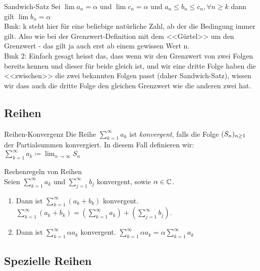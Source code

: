 \begin{theorem}{Sandwich-Satz}
    Sei $\lim a_n = \alpha$ und $\lim c_n = \alpha$ und $a_n \leq b_n \leq c_n, \forall n \geq k$ dann gilt $\lim b_n = \alpha$\\
    Bmk: k steht hier für eine beliebige natürliche Zahl, ab der die Bedingung immer gilt. Also wie bei der Grenzwert-Definition mit dem <<Gürtel>> um den Grenzwert - das gilt ja auch erst ab einem gewissen Wert n.\\
    Bmk 2: Einfach gesagt heisst das, dass wenn wir den Grenzwert von zwei Folgen bereits kennen und dieser für beide gleich ist, und wir eine dritte Folge haben die <<zwischen>> die zwei bekannten Folgen passt (daher Sandwich-Satz), wissen wir dass auch die dritte Folge den gleichen Grenzwert wie die anderen zwei hat.
\end{theorem}

\subsection{Reihen}

\begin{definition}{Reihen-Konvergenz}
    Die Reihe $\sum_{k = 1}^\infty a_k$ ist \emph{konvergent}, falls die Folge $\sequence[S]$ der Partialsummen konvergiert. In diesem Fall definieren wir: $\sum_{k = 1}^\infty a_k \coloneqq \lim_{n \to \infty} S_n$
\end{definition}

\begin{theorem}{Rechenregeln von Reihen}
    \\Seien $\sum_{k=1}^\infty a_k$ und $\sum_{j=1}^\infty b_j$ konvergent, sowie $\alpha \in \C$.
    \begin{enumerate}
        \item Dann ist $\sum_{k=1}^\infty (a_k + b_k)$ konvergent.\\
            $\sum_{k=1}^\infty (a_k + b_k) = (\sum_{k=1}^\infty a_k) + (\sum_{j=1}^\infty b_j)$.
        \item Dann ist $\sum_{k=1}^\infty \alpha a_k$ konvergent. $\sum_{k=1}^\infty \alpha a_k = \alpha \sum_{k=1}^\infty a_k$
    \end{enumerate}
\end{theorem}

\subsection{Spezielle Reihen}

